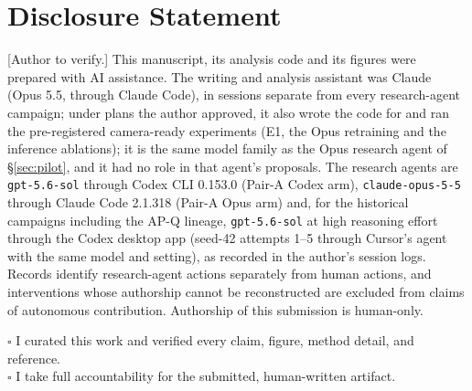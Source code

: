 \documentclass{article}
\newcommand{\authortodo}[1]{{\color{humanframe}[#1]}}
\begin{document}
\section{Disclosure Statement}
\authortodo{Author to verify.} This manuscript, its analysis code and its figures were prepared with AI assistance. The writing and analysis assistant was Claude (Opus 5.5, through Claude Code), in sessions separate from every research-agent campaign; under plans the author approved, it also wrote the code for and ran the pre-registered camera-ready experiments (E1, the Opus retraining and the inference ablations); it is the same model family as the Opus research agent of \S\ref{sec:pilot}, and it had no role in that agent's proposals. The research agents are \texttt{gpt-5.6-sol} through Codex CLI 0.153.0 (Pair-A Codex arm), \texttt{claude-opus-5-5} through Claude Code 2.1.318 (Pair-A Opus arm) and, for the historical campaigns including the AP-Q lineage, \texttt{gpt-5.6-sol} at high reasoning effort through the Codex desktop app (seed-42 attempts 1--5 through Cursor's agent with the same model and setting), as recorded in the author's session logs. Records identify research-agent actions separately from human actions, and interventions whose authorship cannot be reconstructed are excluded from claims of autonomous contribution. Authorship of this submission is human-only.

\noindent$\square$ I curated this work and verified every claim, figure, method detail, and reference.\\
$\square$ I take full accountability for the submitted, human-written artifact.

\clearpage


\end{document}
